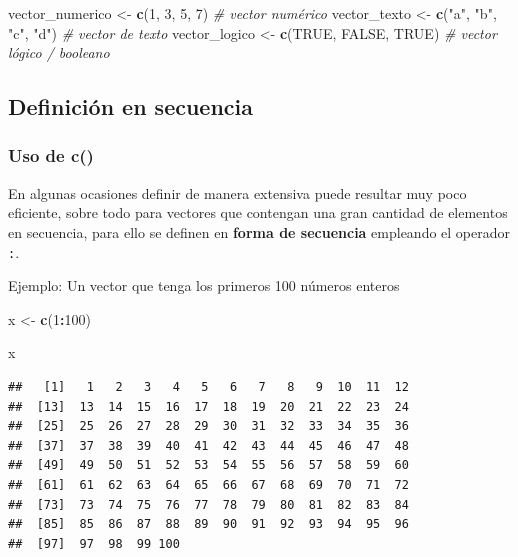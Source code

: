 \documentclass[
]{book}
\newenvironment{Shaded}{\begin{snugshade}}{\end{snugshade}}
\newcommand{\CommentTok}[1]{\textcolor[rgb]{0.56,0.35,0.01}{\textit{#1}}}
\newcommand{\ConstantTok}[1]{\textcolor[rgb]{0.56,0.35,0.01}{#1}}
\newcommand{\DecValTok}[1]{\textcolor[rgb]{0.00,0.00,0.81}{#1}}
\newcommand{\FunctionTok}[1]{\textcolor[rgb]{0.13,0.29,0.53}{\textbf{#1}}}
\newcommand{\NormalTok}[1]{#1}
\newcommand{\OtherTok}[1]{\textcolor[rgb]{0.56,0.35,0.01}{#1}}
\newcommand{\SpecialCharTok}[1]{\textcolor[rgb]{0.81,0.36,0.00}{\textbf{#1}}}
\newcommand{\StringTok}[1]{\textcolor[rgb]{0.31,0.60,0.02}{#1}}
\begin{document}
\begin{Shaded}
\begin{Highlighting}[]
\NormalTok{vector\_numerico }\OtherTok{\textless{}{-}} \FunctionTok{c}\NormalTok{(}\DecValTok{1}\NormalTok{, }\DecValTok{3}\NormalTok{, }\DecValTok{5}\NormalTok{, }\DecValTok{7}\NormalTok{)      }\CommentTok{\# vector numérico}
\NormalTok{vector\_texto }\OtherTok{\textless{}{-}} \FunctionTok{c}\NormalTok{(}\StringTok{"a"}\NormalTok{, }\StringTok{"b"}\NormalTok{, }\StringTok{"c"}\NormalTok{, }\StringTok{"d"}\NormalTok{) }\CommentTok{\# vector de texto}
\NormalTok{vector\_logico }\OtherTok{\textless{}{-}} \FunctionTok{c}\NormalTok{(}\ConstantTok{TRUE}\NormalTok{, }\ConstantTok{FALSE}\NormalTok{, }\ConstantTok{TRUE}\NormalTok{) }\CommentTok{\# vector lógico / booleano}
\end{Highlighting}
\end{Shaded}

\subsection{Definición en secuencia}\label{definiciuxf3n-en-secuencia}

\subsubsection{Uso de c()}\label{uso-de-c}

En algunas ocasiones definir de manera extensiva puede resultar muy poco eficiente, sobre todo para vectores que contengan una gran cantidad de elementos en secuencia, para ello se definen en \textbf{forma de secuencia} empleando el operador \texttt{:}.

Ejemplo:
Un vector que tenga los primeros 100 números enteros

\begin{Shaded}
\begin{Highlighting}[]
\NormalTok{x }\OtherTok{\textless{}{-}} \FunctionTok{c}\NormalTok{(}\DecValTok{1}\SpecialCharTok{:}\DecValTok{100}\NormalTok{)}

\NormalTok{x}
\end{Highlighting}
\end{Shaded}

\begin{verbatim}
##   [1]   1   2   3   4   5   6   7   8   9  10  11  12
##  [13]  13  14  15  16  17  18  19  20  21  22  23  24
##  [25]  25  26  27  28  29  30  31  32  33  34  35  36
##  [37]  37  38  39  40  41  42  43  44  45  46  47  48
##  [49]  49  50  51  52  53  54  55  56  57  58  59  60
##  [61]  61  62  63  64  65  66  67  68  69  70  71  72
##  [73]  73  74  75  76  77  78  79  80  81  82  83  84
##  [85]  85  86  87  88  89  90  91  92  93  94  95  96
##  [97]  97  98  99 100
\end{verbatim}
\end{document}
